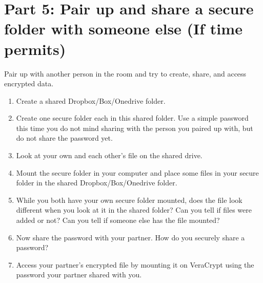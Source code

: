 \documentclass{tufte-handout}
\begin{document}
\newpage

\section{Part 5: Pair up and share a secure folder with someone else (If time permits)}
Pair up with another person in the room and try to create, share, and access encrypted data.
\begin{enumerate}
	\item Create a shared Dropbox/Box/Onedrive folder.
	\item Create one secure  folder each in this shared folder. Use a simple password this time you do not mind sharing with the person you paired up with, but do not share the password yet.
	\item Look at your own and each other's file on the shared drive.
	\item Mount the secure folder in your computer and place some files in your secure folder in the shared Dropbox/Box/Onedrive folder.
	\item While you both have your own secure folder mounted, does the file look different when you look at it in the shared folder? Can you tell if files were added or not? Can you tell if someone else has the file mounted?
	\item Now share the password with your partner. How do you securely share a password?
	\item Access your partner's encrypted file by mounting it on VeraCrypt using the password your partner shared with you.
\end{enumerate}
\end{document}
